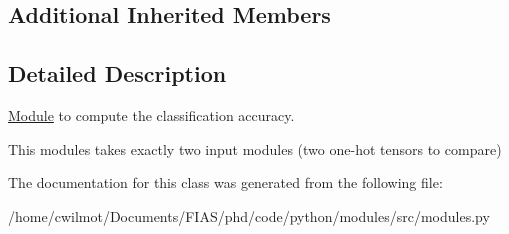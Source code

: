 \subsection*{Additional Inherited Members}


\subsection{Detailed Description}
\hyperlink{classmodules_1_1_module}{Module} to compute the classification accuracy. 

This modules takes exactly two input modules (two one-\/hot tensors to compare) 

The documentation for this class was generated from the following file\+:\begin{DoxyCompactItemize}
\item 
/home/cwilmot/\+Documents/\+F\+I\+A\+S/phd/code/python/modules/src/modules.\+py\end{DoxyCompactItemize}
